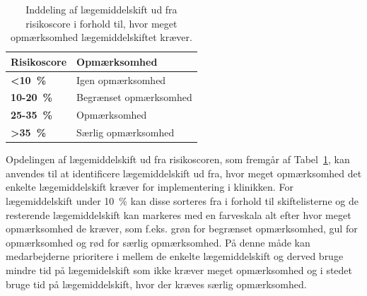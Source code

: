 \vspace{0.5cm}
\begin{table}[H]
\caption{Inddeling af lægemiddelskift ud fra risikoscore i forhold til, hvor meget opmærksomhed lægemiddelskiftet kræver.}
\vspace{2mm}
\label{table:cutoff}
\centering
\begin{tabular}{l|l}
\rowcolor[HTML]{C0C0C0}\textbf{Risikoscore} & \textbf{ Opmærksomhed} \\ \hline
\cellcolor[HTML]{C0C0C0} \textbf{<10~\%} & Igen opmærksomhed \\ \hline
\cellcolor[HTML]{C0C0C0}\textbf{10-20~\%} & Begrænset opmærksomhed \\ \hline
\cellcolor[HTML]{C0C0C0}\textbf{25-35~\% }& Opmærksomhed  \\ \hline
\cellcolor[HTML]{C0C0C0}\textbf{>35~\%} & Særlig opmærksomhed \\
\end{tabular}
\end{table}

Opdelingen af lægemiddelskift ud fra risikoscoren, som fremgår af Tabel~\ref{table:cutoff}, kan anvendes til at identificere lægemiddelskift ud fra, hvor meget opmærksomhed det enkelte lægemiddelskift kræver for implementering i klinikken. For lægemiddelskift under 10~\% kan disse sorteres fra i forhold til skiftelisterne og de resterende lægemiddelskift kan markeres med en farveskala alt efter hvor meget opmærksomhed de kræver, som f.eks. grøn for begrænset opmærksomhed, gul for opmærksomhed og rød for særlig opmærksomhed. På denne måde kan medarbejderne prioritere i mellem de enkelte lægemiddelskift og derved bruge mindre tid på lægemidelskift som ikke kræver meget opmærksomhed og i stedet bruge tid på lægemiddelskift, hvor der kræves særlig opmærksomhed.

